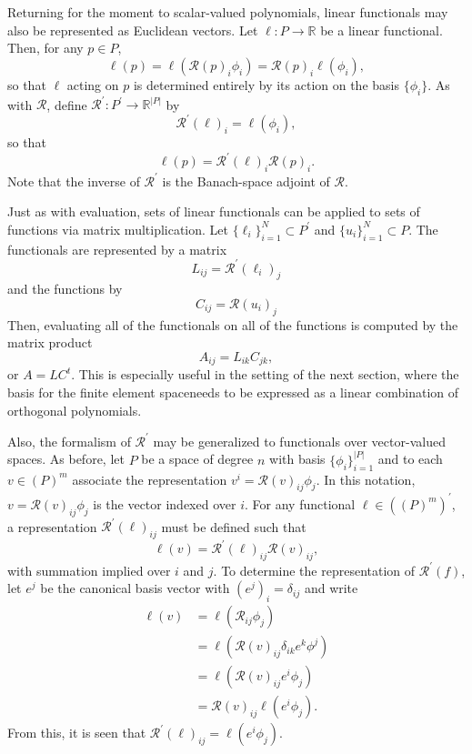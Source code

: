 Returning for the moment to scalar-valued polynomials, linear
functionals may also be represented as
Euclidean vectors.  Let \( \ell: P \rightarrow \mathbb{R} \) be a linear
functional.  Then, for any \( p \in P \),
\[
\ell( p ) = \ell( \mathcal{R}(p)_i \phi_i )
= \mathcal{R}(p)_i \ell( \phi_i ),
\]
so that \( \ell \) acting on \( p \) is determined entirely by its
action on the basis \( \{ \phi_i \} \).  As with \( \mathcal{R} \), define
\( \mathcal{R}^\prime : P^\prime \rightarrow \mathbb{R}^{|P|} \) by
\[
  \mathcal{R}^\prime (\ell)_i
= \ell( \phi_i),
\]
so that
\[
\ell(p) = \mathcal{R}^\prime(\ell)_i\mathcal{R}(p)_i.
\]
Note that the inverse of \( \mathcal{R}^\prime \) is the Banach-space
adjoint of \( \mathcal{R} \).

Just as with evaluation, sets of linear functionals can be applied to
sets of functions via matrix multiplication.  Let \( \{ \ell_i
\}_{i=1}^N \subset P^\prime \) and \( \{ u_i \}_{i=1}^N \subset P \).
The functionals are represented by a matrix
\[
L_{ij} = \mathcal{R}^\prime(\ell_i)_j
\]
and the functions by
\[
C_{ij} = \mathcal{R}(u_i)_j
\]
Then, evaluating all of the functionals on all of the functions is
computed by the matrix product
\begin{equation}
A_{ij} = L_{ik}C_{jk},
\end{equation}
or \( A = L C^t \).  This is especially useful in the setting of the
next section, where the basis for the finite element spaceneeds to be
expressed as a linear combination of orthogonal polynomials.

Also, the formalism of \( \mathcal{R}^\prime \) may be generalized to
functionals over vector-valued spaces.  As before, let \( P \) be a
space of degree \( n \) with basis \( \{ \phi_i \}_{i=1}^{|P|} \) and
to each \( v \in (P)^m \) associate the representation \( v^i
= \mathcal{R}(v)_{ij}\phi_j \).  In this notation,
\( v = \mathcal{R}(v)_{ij} \phi_j \) is the vector indexed over \( i \).
For any functional
\( \ell \in \left( \left(P\right)^m \right)^\prime \), a
representation \( \mathcal{R}^\prime(\ell)_{ij} \) must be defined
such that
\[
\ell(v) = \mathcal{R}^\prime(\ell)_{ij} \mathcal{R}(v)_{ij},
\]
with summation implied over \(i\) and \( j\).  To determine the
representation of \( \mathcal{R}^\prime(f) \), let \( e^j \) be the
canonical basis vector with \( (e^j)_i = \delta_{ij} \) and
write
\begin{equation}
\begin{split}
\ell(v) & = \ell( \mathcal{R}_{ij}\phi_j ) \\
& = \ell( \mathcal{R}(v)_{ij} \delta_{ik} e^k \phi^j ) \\
& = \ell( \mathcal{R}(v)_{ij} e^i \phi_j ) \\
& = \mathcal{R}(v)_{ij} \ell( e^i \phi_j ).
\end{split}
\end{equation}
From this, it is seen that \( \mathcal{R}^\prime(\ell)_{ij} = \ell(
e^i \phi_j ) \).

